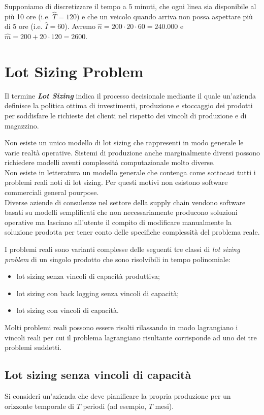 Supponiamo di discretizzare il tempo a 5 minuti, che ogni linea sia disponibile al più 10 ore (i.e. $\hat{T}=120$) e che un veicolo quando arriva non possa aspettare più di 5 ore (i.e. $\hat{I}=60$). Avremo $\hat{n}=200\cdot20\cdot60=240.000$ e $\hat{m}=200+20\cdot120=2600$.

\section{Lot Sizing Problem}
Il termine \textit{\textbf{Lot Sizing}} indica il processo decisionale mediante il quale un'azienda definisce la politica ottima di investimenti, produzione e stoccaggio dei prodotti per soddisfare le richieste dei clienti nel rispetto dei vincoli di produzione e di magazzino.

Non esiste un unico modello di lot sizing che rappresenti in modo generale le varie realtà operative. Sistemi di produzione anche marginalmente diversi possono richiedere modelli aventi complessità computazionale molto diverse.\\
Non esiste in letteratura un modello generale che contenga come sottocasi tutti i problemi reali noti di lot sizing. Per questi motivi non esistono software commerciali general pourpose.\\
Diverse aziende di consulenze nel settore della supply chain vendono software basati su modelli semplificati che non necessariamente producono soluzioni operative ma lasciano all'utente il compito di modificare manualmente la soluzione prodotta per tener conto delle specifiche complessità del problema reale.

I problemi reali sono varianti complesse delle seguenti tre classi di \textit{lot sizing problem} di un singolo prodotto che sono risolvibili in tempo polinomiale:
\begin{itemize}
	\item lot sizing senza vincoli di capacità produttiva;
	\item lot sizing con back logging senza vincoli di capacità;
	\item lot sizing con vincoli di capacità.
\end{itemize}
Molti problemi reali possono essere risolti rilassando in modo lagrangiano i vincoli reali per cui il problema lagrangiano risultante corrisponde ad uno dei tre problemi suddetti.

\subsection{Lot sizing senza vincoli di capacit\`a}
Si consideri un'azienda che deve pianificare la propria produzione per un orizzonte temporale di $T$ periodi (ad esempio, $T$ mesi).

